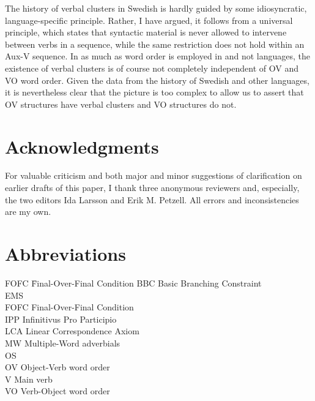 \documentclass[output=paper, colorlinks, citecolor=brown]{langscibook}
\begin{document}
The history of verbal clusters in Swedish is hardly guided by some idiosyncratic, language-specific principle. Rather, I have argued, it follows from a universal principle, which states that syntactic material is never allowed to intervene between verbs in a  sequence, while the same restriction does not hold within an Aux-V sequence. In as much as  word order is employed in  and not  languages, the existence of verbal clusters is of course not completely independent of OV and VO word order. Given the data from the history of Swedish and other languages, it is nevertheless clear that the picture is too complex to allow us to assert that OV structures have verbal clusters and VO structures do not.


\section*{Acknowledgments}


For valuable criticism and both major and minor suggestions of clarification on earlier drafts of this paper, I thank three anonymous reviewers and, especially, the two editors Ida Larsson and Erik M. Petzell. All errors and inconsistencies are my own.


\section*{Abbreviations}
\begin{multicols}{2}
\begin{tabbing}
FOFC \hspace{.5ex} \= Final-Over-Final Condition\kill
{}BBC  \>   Basic Branching Constraint\\
EMS  \>   \\
FOFC \>    Final-Over-Final Condition\\
IPP  \>   Infinitivus Pro Participio\\
LCA  \>   Linear Correspondence Axiom\\
MW   \>  Multiple-Word adverbials\\
OS   \>  \\
OV   \>  Object-Verb word order\\
V    \> Main verb\\
VO   \>  Verb-Object word order
\end{tabbing}
\end{multicols}
\end{document}
